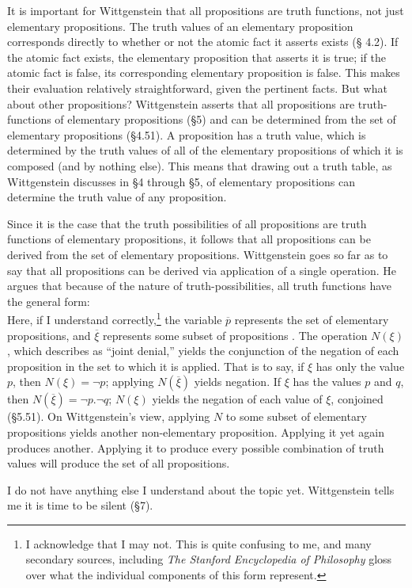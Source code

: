 \documentclass[12pt]{apa}
\begin{document}
It is important for Wittgenstein that all propositions are truth functions, not
just elementary propositions. The truth values of an elementary proposition
corresponds directly to whether or not the atomic fact it asserts exists (\S
4.2). If the atomic fact exists, the elementary proposition that asserts it is
true; if the atomic fact is false, its corresponding elementary proposition is
false. This makes their evaluation relatively straightforward, given the
pertinent facts. But what about other propositions? Wittgenstein asserts that
all propositions are truth-functions of elementary propositions (\S 5) and can
be determined from the set of elementary propositions (\S 4.51). A proposition
has a truth value, which is determined by the truth values of all of the
elementary propositions of which it is composed (and by nothing else). This
means that drawing out a truth table, as Wittgenstein discusses in \S 4 through
\S 5, of elementary propositions can determine the truth value of any
proposition.

Since it is the case that the truth possibilities of all propositions are truth
functions of elementary propositions, it follows that all propositions can be
derived from the set of elementary propositions. Wittgenstein goes so far as to
say that all propositions can be derived via application of a single operation.
He argues that because of the nature of truth-possibilities, all truth
functions have the general form: 
\begin{equation}
	[ \overline{p}, \overline{\xi}, N(\overline{\xi}) ]
\end{equation}
Here, if I understand correctly,\footnote{I acknowledge that I may not. This is
quite confusing to me, and many secondary sources, including \emph{The Stanford
Encyclopedia of Philosophy} gloss over what the individual components of this
form represent.} the variable $ \overline{p} $ represents the set of elementary
propositions, and $ \overline{\xi} $ represents some subset of propositions
\cite{Speaks07}. The operation $ N( \xi ) $, which  describes as
``joint denial,'' yields the conjunction of the negation of each proposition in
the set to which it is applied. That is to say, if $\xi$ has only the value
$p$, then $N(\xi) = \neg p$; applying $N(\overline{\xi})$ yields negation. If
$\xi$ has the values $p$ and $q$, then $N(\overline{\xi}) = \neg p. \neg q$;
$N(\xi)$ yields the negation of each value of $\xi$, conjoined (\S 5.51). On
Wittgenstein's view, applying $N$ to some subset of elementary propositions
yields another non-elementary proposition. Applying it yet again produces
another. Applying it to produce every possible combination of truth values will
produce the set of all propositions.

I do not have anything else I understand about the topic yet. Wittgenstein
tells me it is time to be silent (\S 7).

\clearpage

{}

\end{document}
